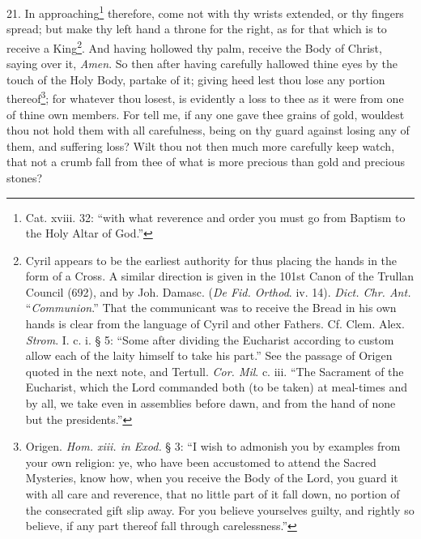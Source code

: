 21. In approaching\footnote{Cat. xviii. 32: “with what reverence and order you must go from Baptism to the Holy Altar of God.”} therefore, come not with thy wrists extended, or thy fingers spread; but make thy left hand a throne for the right, as for that which is to receive a King\footnote{Cyril appears to be the earliest authority for thus placing the hands in the form of a Cross. A similar direction is given in the 101st Canon of the Trullan Council (692), and by Joh. Damasc. (\emph{De Fid. Orthod}. iv. 14). \emph{Dict. Chr. Ant.} “\emph{Communion}.” That the communicant was to receive the Bread in his own hands is clear from the language of Cyril and other Fathers. Cf. Clem. Alex. \emph{Strom}. I. c. i. § 5: “Some after dividing the Eucharist according to custom allow each of the laity himself to take his part.” See the passage of Origen quoted in the next note, and Tertull. \emph{Cor. Mil}. c. iii. “The Sacrament of the Eucharist, which the Lord commanded both (to be taken) at meal-times and by all, we take even in assemblies before dawn, and from the hand of none but the presidents.”}. And having hollowed thy palm, receive the Body of Christ, saying over it, \emph{Amen}. So then after having carefully hallowed thine eyes by the touch of the Holy Body, partake of it; giving heed lest thou lose any portion thereof\footnote{Origen. \emph{Hom. xiii. in Exod.} § 3: “I wish to admonish you by examples from your own religion: ye, who have been accustomed to attend the Sacred Mysteries, know how, when you receive the Body of the Lord, you guard it with all care and reverence, that no little part of it fall down, no portion of the consecrated gift slip away. For you believe yourselves guilty, and rightly so believe, if any part thereof fall through carelessness.”}; for whatever thou losest, is evidently a loss to thee as it were from one of thine own members. For tell me, if any one gave thee grains of gold, wouldest thou not hold them with all carefulness, being on thy guard against losing any of them, and suffering loss? Wilt thou not then much more carefully keep watch, that not a crumb fall from thee of what is more precious than gold and precious stones?

